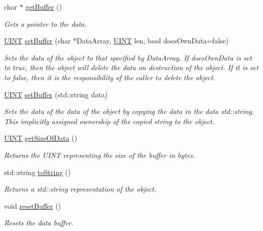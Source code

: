 \begin{DoxyCompactItemize}
char $\ast$ \hyperlink{class_communication_1_1base_data_buffer_a6c5969f0136efb534ec125ebf1a916f7}{get\+Buffer} ()
\begin{DoxyCompactList}\small\item\em Gets a pointer to the data. \end{DoxyCompactList}\item 
\hyperlink{typedefs_8h_a2e2c38961834f28c06e17e074eb00bc7}{U\+I\+N\+T} \hyperlink{class_communication_1_1base_data_buffer_a416262afb4fa686f7d9cbcab0f47239b}{set\+Buffer} (char $\ast$Data\+Array, \hyperlink{typedefs_8h_a2e2c38961834f28c06e17e074eb00bc7}{U\+I\+N\+T} len, bool does\+Own\+Data=false)
\begin{DoxyCompactList}\small\item\em Sets the data of the object to that specified by Data\+Array. If does\+Own\+Data is set to true, then the object will delete the data on destruction of the object. If it is set to false, then it is the responsibility of the caller to delete the object. \end{DoxyCompactList}\item 
\hyperlink{typedefs_8h_a2e2c38961834f28c06e17e074eb00bc7}{U\+I\+N\+T} \hyperlink{class_communication_1_1base_data_buffer_a22c8017bc8b0a4e89e70d2708b2dcc2f}{set\+Buffer} (std\+::string data)
\begin{DoxyCompactList}\small\item\em Sets the data of the data of the object by copying the data in the data std\+::string. This implicitly assigned ownership of the copied string to the object. \end{DoxyCompactList}\item 
\hyperlink{typedefs_8h_a2e2c38961834f28c06e17e074eb00bc7}{U\+I\+N\+T} \hyperlink{class_communication_1_1base_data_buffer_adc057b73886aa1b1a40a586e01f1f396}{get\+Size\+Of\+Data} ()
\begin{DoxyCompactList}\small\item\em Returns the U\+I\+N\+T representing the size of the buffer in bytes. \end{DoxyCompactList}\item 
std\+::string \hyperlink{class_communication_1_1base_data_buffer_a6ebba55d04892bcb4b9d3010d1ed7e42}{to\+String} ()
\begin{DoxyCompactList}\small\item\em Returns a std\+::string representation of the object. \end{DoxyCompactList}\item 
void \hyperlink{class_communication_1_1base_data_buffer_affa063df49e1a105a34af21140058117}{reset\+Buffer} ()
\begin{DoxyCompactList}\small\item\em Resets the data buffer. \end{DoxyCompactList}\end{DoxyCompactItemize}
